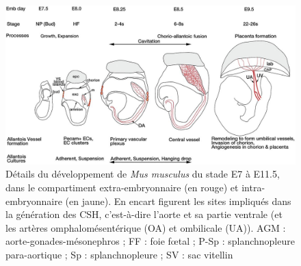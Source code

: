 \documentclass[fleqn,11pt]{SelfArx} %
\begin{document}
\begin{figure}[ht]
\centering
\includegraphics[width=\linewidth]{images/devpt}
\caption{Détails du développement de \textit{Mus musculus}\cite{Gaudin} du stade E7 à E11.5, dans le compartiment extra-embryonnaire (en rouge) et intra-embryonnaire (en jaune). En encart figurent les sites impliqués dans la génération des CSH, c’est-à-dire l’aorte et sa partie ventrale (et les artères omphalomésentérique (OA) et ombilicale (UA)). AGM : aorte-gonades-mésonephros ; FF : foie fœtal ; P-Sp : splanchnopleure para-aortique ; Sp : splanchnopleure ; SV : sac vitellin}
\label{fig:devpt}
\end{figure}





 
%

\end{document}
